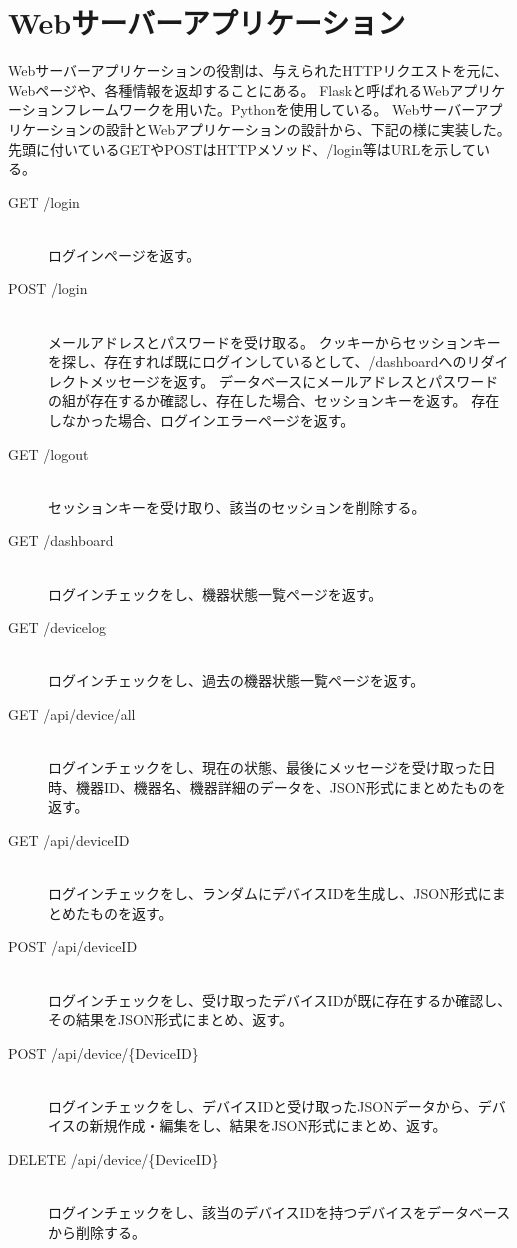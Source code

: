 \section{Webサーバーアプリケーション}
Webサーバーアプリケーションの役割は、与えられたHTTPリクエストを元に、Webページや、各種情報を返却することにある。
Flaskと呼ばれるWebアプリケーションフレームワークを用いた。Pythonを使用している。
Webサーバーアプリケーションの設計とWebアプリケーションの設計から、下記の様に実装した。
先頭に付いているGETやPOSTはHTTPメソッド、/login等はURLを示している。
\begin{description}
	\item[GET /login]\mbox{}\\
		ログインページを返す。
	\item[POST /login]\mbox{}\\
		メールアドレスとパスワードを受け取る。
		クッキーからセッションキーを探し、存在すれば既にログインしているとして、/dashboardへのリダイレクトメッセージを返す。
		データベースにメールアドレスとパスワードの組が存在するか確認し、存在した場合、セッションキーを返す。
		存在しなかった場合、ログインエラーページを返す。
	\item[GET /logout]\mbox{}\\
		セッションキーを受け取り、該当のセッションを削除する。
	\item[GET /dashboard]\mbox{}\\
		ログインチェックをし、機器状態一覧ページを返す。
	\item[GET /devicelog]\mbox{}\\
		ログインチェックをし、過去の機器状態一覧ページを返す。
	\item[GET /api/device/all]\mbox{}\\
		ログインチェックをし、現在の状態、最後にメッセージを受け取った日時、機器ID、機器名、機器詳細のデータを、JSON形式にまとめたものを返す。
	\item[GET /api/deviceID]\mbox{}\\
		ログインチェックをし、ランダムにデバイスIDを生成し、JSON形式にまとめたものを返す。
	\item[POST /api/deviceID]\mbox{}\\
		ログインチェックをし、受け取ったデバイスIDが既に存在するか確認し、その結果をJSON形式にまとめ、返す。
	\item[POST /api/device/\{DeviceID\}]\mbox{}\\
		ログインチェックをし、デバイスIDと受け取ったJSONデータから、デバイスの新規作成・編集をし、結果をJSON形式にまとめ、返す。
	\item[DELETE /api/device/\{DeviceID\}]\mbox{}\\
		ログインチェックをし、該当のデバイスIDを持つデバイスをデータベースから削除する。	
\end{description}


